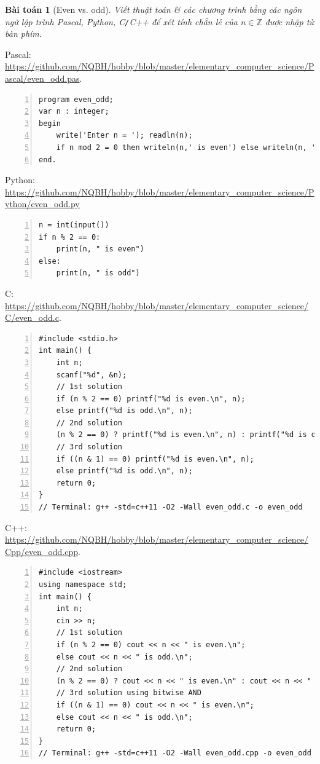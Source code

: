 \documentclass{article}
\newtheorem{baitoan}{Bài toán}
\begin{document}
\begin{baitoan}[Even vs. odd]
	Viết thuật toán \& các chương trình bằng các ngôn ngữ lập trình {\sf Pascal, Python, C\texttt{/}C++} để xét tính chẵn lẻ của $n\in\mathbb{Z}$ được nhập từ bàn phím.
\end{baitoan}
\noindent Pascal: \url{https://github.com/NQBH/hobby/blob/master/elementary_computer_science/Pascal/even_odd.pas}.
\begin{Verbatim}[numbers=left,xleftmargin=5mm]
program even_odd;
var n : integer;
begin
    write('Enter n = '); readln(n);
    if n mod 2 = 0 then writeln(n,' is even') else writeln(n, ' is odd');
end.
\end{Verbatim}
Python: \url{https://github.com/NQBH/hobby/blob/master/elementary_computer_science/Python/even_odd.py}
\begin{Verbatim}[numbers=left,xleftmargin=5mm]
n = int(input())
if n % 2 == 0:
    print(n, " is even")
else:
    print(n, " is odd")
\end{Verbatim}
C: \url{https://github.com/NQBH/hobby/blob/master/elementary_computer_science/C/even_odd.c}.
\begin{Verbatim}[numbers=left,xleftmargin=5mm]
#include <stdio.h>
int main() {
    int n;
    scanf("%d", &n);
    // 1st solution
    if (n % 2 == 0) printf("%d is even.\n", n);
    else printf("%d is odd.\n", n);
    // 2nd solution
    (n % 2 == 0) ? printf("%d is even.\n", n) : printf("%d is odd.\n", n);
    // 3rd solution
    if ((n & 1) == 0) printf("%d is even.\n", n);
    else printf("%d is odd.\n", n);
    return 0;
}
// Terminal: g++ -std=c++11 -O2 -Wall even_odd.c -o even_odd
\end{Verbatim}
C++: \url{https://github.com/NQBH/hobby/blob/master/elementary_computer_science/Cpp/even_odd.cpp}.
\begin{Verbatim}[numbers=left,xleftmargin=5mm]
#include <iostream>
using namespace std;
int main() {
    int n;
    cin >> n;
    // 1st solution
    if (n % 2 == 0) cout << n << " is even.\n";
    else cout << n << " is odd.\n";
    // 2nd solution
    (n % 2 == 0) ? cout << n << " is even.\n" : cout << n << " is odd.\n";
    // 3rd solution using bitwise AND
    if ((n & 1) == 0) cout << n << " is even.\n";
    else cout << n << " is odd.\n";
    return 0;
}
// Terminal: g++ -std=c++11 -O2 -Wall even_odd.cpp -o even_odd
\end{Verbatim}
\end{document}
